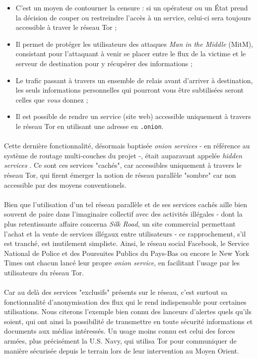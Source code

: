 \begin{itemize}
    \item C'est un moyen de contourner la censure : si un opérateur ou un État prend la décision de couper ou restreindre
    l'accès à un service, celui-ci sera toujours accessible à traver le réseau Tor ;
    \item Il permet de protéger les utilisateurs des attaques \emph{Man in the Middle} (MitM), consistant pour l'attaquant
    à venir se placer entre le flux de la victime et le serveur de destination pour y récupérer des informations ;
    \item Le trafic passant à travers un ensemble de relais avant d'arriver à destination, les seuls informations personnelles
    qui pourront vous être subtilisées seront celles que \emph{vous} donnez ;
    \item Il est possible de rendre un service (site web) accessible uniquement à travers le réseau Tor en utilisant une
    adresse en \lstinline{.onion}.
\end{itemize}

\paragraph{} Cette dernière fonctionnalité, désormais baptisée \emph{onion services} - en référence au système de routage
multi-couches du projet -, était auparavant appelée \emph{hidden services} \cite{Internet5}. Ce sont ces services "cachés",
car accessibles uniquement à travers le réseau Tor, qui firent émerger la notion de réseau parallèle "sombre" car non 
accessible par des moyens conventionels.

\paragraph{} Bien que l'utilisation d'un tel réseau parallèle et de ses services cachés aille bien souvent de paire dans 
l'imaginaire collectif avec des activités illégales - dont la plus retentissante affaire concerna \emph{Silk Road}, un 
site commercial permettant l'achat et la vente de services illégaux entre utilisateurs - ce rapprochement, s'il est tranché, est inutilement
simpliste. Ainsi, le réseau social Facebook, le Service National de Police et des Poursuites Publics du Pays-Bas \cite{Internet6}
ou encore le New York Times \cite{Internet7} ont chacun lancé leur propre \emph{onion service}, en facilitant l'usage par 
les utilisateurs du réseau Tor.

\paragraph{} Car au delà des services "exclusifs" présents sur le réseau, c'est surtout sa fonctionnalité d'anonymisation
des flux qui le rend indispensable pour certaines utilisations. Nous citerons l'exemple bien connu des lanceurs d'alertes
quels qu'ils soient, qui ont ainsi la possibilité de transmettre en toute sécurité informations et documents aux médias
intéressés. Un usage moins connu est celui des forces armées, plus précisément la U.S. Navy, qui utilisa Tor pour communiquer
de manière sécurisée depuis le terrain lors de leur intervention au Moyen Orient.

